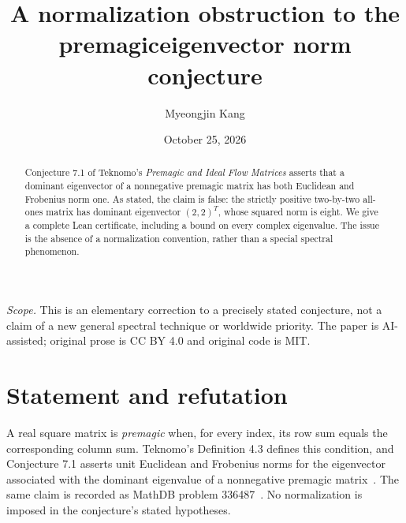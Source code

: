 \documentclass[11pt]{article}
\title{A normalization obstruction to the premagic\newline eigenvector norm conjecture}
\author{Myeongjin Kang}
\date{October 25, 2026}
\begin{document}
\maketitle
\begin{abstract}
Conjecture 7.1 of Teknomo's \emph{Premagic and Ideal Flow Matrices}
asserts that a dominant eigenvector of a nonnegative premagic matrix
has both Euclidean and Frobenius norm one. As stated, the claim is false:
the strictly positive two-by-two all-ones matrix has dominant eigenvector
$(2,2)^T$, whose squared norm is eight. We give a complete Lean certificate,
including a bound on every complex eigenvalue. The issue is the absence of
a normalization convention, rather than a special spectral phenomenon.
\end{abstract}
\noindent\textit{Scope.} This is an elementary correction to a precisely
stated conjecture, not a claim of a new general spectral technique or
worldwide priority. The paper is AI-assisted; original prose is CC BY 4.0
and original code is MIT.

\section{Statement and refutation}
A real square matrix is \emph{premagic} when, for every index, its row sum
equals the corresponding column sum. Teknomo's Definition 4.3 defines this
condition, and Conjecture 7.1 asserts unit Euclidean and Frobenius norms
for the eigenvector associated with the dominant eigenvalue of a
nonnegative premagic matrix~\cite{Teknomo}. The same claim is recorded as
MathDB problem 336487~\cite{MathDB}. No normalization is imposed in the
conjecture's stated hypotheses.
\end{document}
